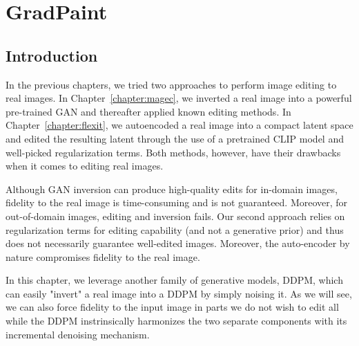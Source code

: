 \chapter{GradPaint}
\label{chapter:gradpaint}

 



\section{Introduction}

In the previous chapters, we tried two approaches to perform image editing to real images. In 
Chapter~\ref{chapter:magec}, we inverted a real image into a powerful pre-trained \ac{GAN} 
and thereafter applied known editing methods.
In Chapter~\ref{chapter:flexit}, we  autoencoded a real image into a compact latent space and edited the resulting latent through 
the use of a pretrained \ac{CLIP} model and well-picked regularization terms. Both methods, however, 
have their drawbacks when it comes to editing real images. 

Although \ac{GAN} inversion can produce high-quality edits for in-domain images, fidelity to the real image is time-consuming
 and is not guaranteed. 
Moreover, for out-of-domain images, editing and inversion fails. Our second approach relies on regularization terms for editing capability 
(and not a generative prior) and thus does not necessarily guarantee well-edited images. Moreover, the auto-encoder by nature 
compromises   fidelity to the real image. 

In this chapter, we leverage another family of generative models, \ac{DDPM}, which can easily "invert" a real image 
into a \ac{DDPM} by simply noising it. As we will see, we can also force fidelity to the input image in parts we do not wish to edit 
all while the \ac{DDPM} instrinsically harmonizes the two separate components with its incremental denoising mechanism. 


